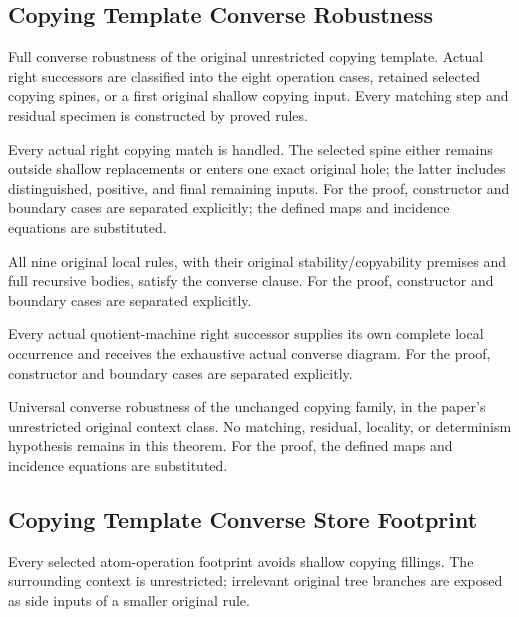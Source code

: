 \subsection{Copying Template Converse Robustness}
Full converse robustness of the original unrestricted copying template. Actual right successors are classified into the eight operation cases, retained selected copying spines, or a first original shallow copying input. Every matching step and residual specimen is constructed by proved rules.

Every actual right copying match is handled. The selected spine either remains outside shallow replacements or enters one exact original hole; the latter includes distinguished, positive, and final remaining inputs.
For the proof, constructor and boundary cases are separated explicitly; the defined maps and incidence equations are substituted.
\par{}

All nine original local rules, with their original stability/copyability premises and full recursive bodies, satisfy the converse clause.
For the proof, constructor and boundary cases are separated explicitly.
\par{}

Every actual quotient-machine right successor supplies its own complete local occurrence and receives the exhaustive actual converse diagram.
For the proof, constructor and boundary cases are separated explicitly.
\par{}

Universal converse robustness of the unchanged copying family, in the paper's unrestricted original context class. No matching, residual, locality, or determinism hypothesis remains in this theorem.
For the proof, the defined maps and incidence equations are substituted.
\par{}

\subsection{Copying Template Converse Store Footprint}
Every selected atom-operation footprint avoids shallow copying fillings. The surrounding context is unrestricted; irrelevant original tree branches are exposed as side inputs of a smaller original rule.

